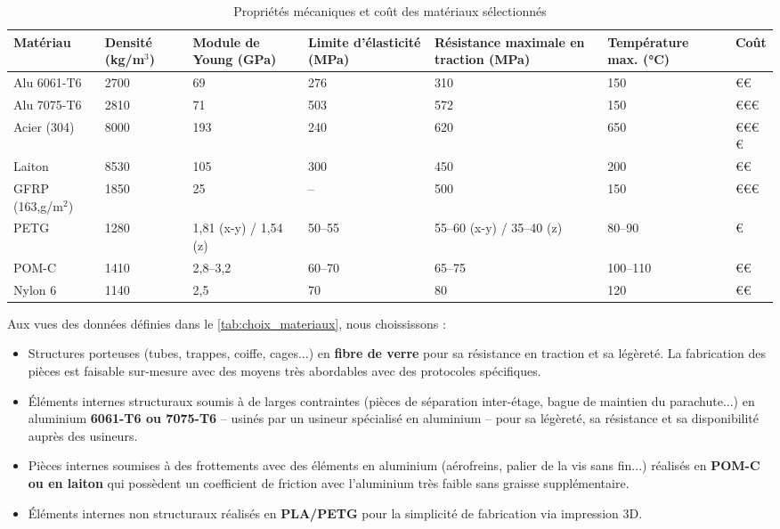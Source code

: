 \begin{table}[h!]
    \centering
    \begin{tabular}{|p{2cm}|p{1.2cm}|p{1.8cm}|p{1.8cm}|p{3cm}|p{2cm}|p{0.8cm}|}
        \hline
        Matériau & Densité (kg/m$^3$) & Module de Young (GPa) & Limite d'élasticité (MPa) & Résistance maximale en traction (MPa) & Température max. (°C) & Coût \\ \hline
        Alu 6061-T6 & 2700 & 69 & 276 & 310 & 150 & €€ \\ \hline
        Alu 7075-T6 & 2810 & 71 & 503 & 572 & 150 & €€€ \\ \hline
        Acier (304) & 8000 & 193 & 240 & 620 & 650 & €€€€ \\ \hline
        Laiton & 8530 & 105 & 300 & 450 & 200 & €€ \\ \hline
        GFRP (163,g/m$^2$) & 1850 & 25 & -- & 500 & 150 & €€€ \\ \hline
        PETG & 1280 & 1,81 (x-y) / 1,54 (z) & 50--55 & 55--60 (x-y) / 35--40 (z) & 80--90 & € \\ \hline
        POM-C & 1410 & 2,8--3,2 & 60--70 & 65--75 & 100--110 & €€ \\ \hline
        Nylon 6 & 1140 & 2,5 & 70 & 80 & 120 & €€ \\ \hline
    \end{tabular}
    \caption{Propriétés mécaniques et coût des matériaux sélectionnés}
    \label{tab:choix_materiaux}
\end{table}

Aux vues des données définies dans le \autoref{tab:choix_materiaux}, nous choississons :
\begin{itemize}
    \item Structures porteuses (tubes, trappes, coiffe, cages...) en \textbf{fibre de verre} pour sa résistance en traction et sa légèreté. La fabrication des pièces est faisable sur-mesure avec des moyens très abordables avec des protocoles spécifiques.
    \item Éléments internes structuraux soumis à de larges contraintes (pièces de séparation inter-étage, bague de maintien du parachute...) en aluminium \textbf{6061-T6 ou 7075-T6} -- usinés par un usineur spécialisé en aluminium -- pour sa légèreté, sa résistance et sa disponibilité auprès des usineurs.
    \item Pièces internes soumises à des frottements avec des éléments en aluminium (aérofreins, palier de la vis sans fin...) réalisés en \textbf{POM-C ou en laiton} qui possèdent un coefficient de friction avec l'aluminium très faible sans graisse supplémentaire.
    \item Éléments internes non structuraux réalisés en \textbf{PLA/PETG} pour la simplicité de fabrication via impression 3D.
\end{itemize}

